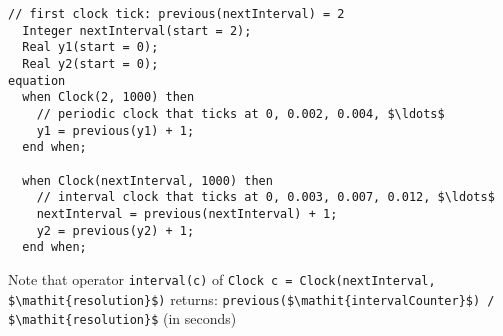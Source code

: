 \begin{operatordefinition*}[Clock]
\begin{semantics}
\begin{example}
\begin{lstlisting}[language=modelica]
  // first clock tick: previous(nextInterval) = 2
  Integer nextInterval(start = 2);
  Real y1(start = 0);
  Real y2(start = 0);
equation
  when Clock(2, 1000) then
    // periodic clock that ticks at 0, 0.002, 0.004, $\ldots$
    y1 = previous(y1) + 1;
  end when;

  when Clock(nextInterval, 1000) then
    // interval clock that ticks at 0, 0.003, 0.007, 0.012, $\ldots$
    nextInterval = previous(nextInterval) + 1;
    y2 = previous(y2) + 1;
  end when;
\end{lstlisting}
\end{example}

Note that operator \lstinline!interval(c)! of \lstinline!Clock c = Clock(nextInterval, $\mathit{resolution}$)! returns:\newline
\lstinline!previous($\mathit{intervalCounter}$) / $\mathit{resolution}$! (in seconds)
\end{semantics}
\end{operatordefinition*}

